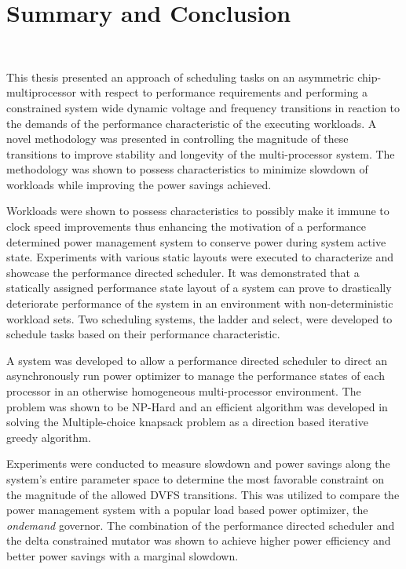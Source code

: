 \chapter{Summary and Conclusion}~\label{chap:conclusion}

This thesis presented an approach of scheduling tasks on an asymmetric chip-multiprocessor
with respect to performance requirements and performing a constrained system wide
dynamic voltage and frequency transitions in reaction to the demands of the
performance characteristic of the executing workloads. A novel methodology was
presented in controlling the magnitude of these transitions to improve stability
and longevity of the multi-processor system. The methodology was shown to possess 
characteristics to minimize slowdown of workloads while improving the power savings achieved. 

Workloads were shown to possess characteristics to possibly make it immune to clock 
speed improvements thus enhancing the motivation of a performance determined power
management system to conserve power during system active state. Experiments with various 
static layouts were executed to characterize and showcase 
the performance directed scheduler. It was demonstrated that a statically assigned
performance state layout of a system can prove to drastically deteriorate performance 
of the system in an environment with non-deterministic workload sets. 
Two scheduling systems, the ladder and select, were developed to schedule tasks based on
their performance characteristic.

A system was developed to allow a performance directed scheduler to direct an asynchronously
run power optimizer to manage the performance states of each processor in an otherwise 
homogeneous multi-processor environment. The problem was shown to be NP-Hard and an 
efficient algorithm was developed in solving the Multiple-choice knapsack problem 
as a direction based iterative greedy algorithm.

Experiments were conducted to measure slowdown and power savings along the system's entire
parameter space to determine the most favorable constraint on the magnitude of the 
allowed DVFS transitions. This was utilized to compare the power management system
with a popular load based power optimizer, the \textit{ondemand} governor.
The combination of the performance directed scheduler and the delta constrained mutator
was shown to achieve higher power efficiency and better power savings with a marginal 
slowdown.

